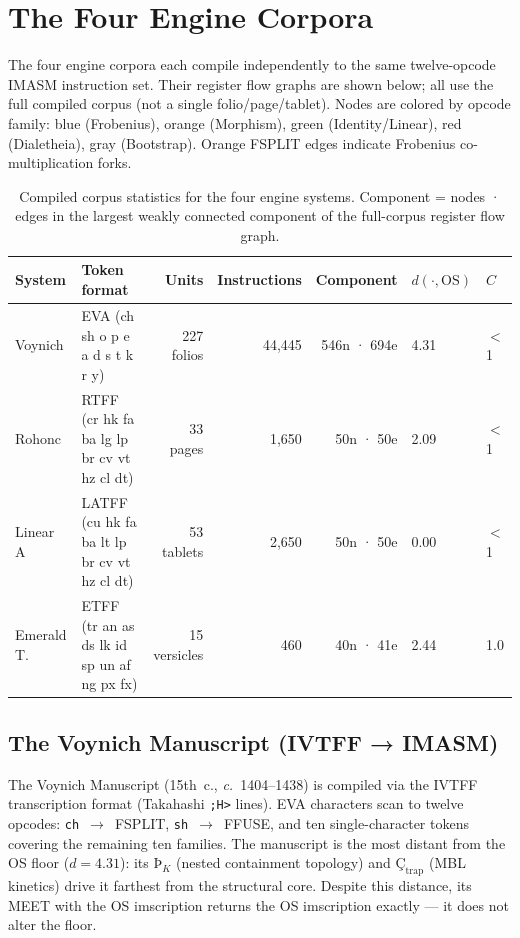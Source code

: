 \documentclass[12pt,a4paper]{article}
\begin{document}
\section{The Four Engine Corpora}
\label{sec:engines}

The four engine corpora each compile independently to the same twelve-opcode IMASM
instruction set. Their register flow graphs are shown below; all use the full compiled
corpus (not a single folio/page/tablet). Nodes are colored by opcode family: blue
(Frobenius), orange (Morphism), green (Identity/Linear), red (Dialetheia), gray
(Bootstrap). Orange FSPLIT edges indicate Frobenius co-multiplication forks.

\begin{table}[htbp]
\centering
\small
\begin{tabular}{llrrrll}
\toprule
System & Token format & Units & Instructions & Component & $d(\cdot,\text{OS})$ & $C$ \\
\midrule
Voynich      & EVA (ch sh o p e a d s t k r y)       & 227 folios   & 44{,}445 & 546n · 694e & 4.31 & $<$1 \\
Rohonc       & RTFF (cr hk fa ba lg lp br cv vt hz cl dt) & 33 pages  &  1{,}650 &  50n ·  50e & 2.09 & $<$1 \\
Linear A     & LATFF (cu hk fa ba lt lp br cv vt hz cl dt) & 53 tablets & 2{,}650 &  50n ·  50e & 0.00 & $<$1 \\
Emerald T.   & ETFF (tr an as ds lk id sp un af ng px fx) & 15 versicles &  460 &  40n ·  41e & 2.44 & 1.0 \\
\bottomrule
\end{tabular}
\caption{Compiled corpus statistics for the four engine systems. Component = nodes · edges
in the largest weakly connected component of the full-corpus register flow graph.}
\label{tab:engines}
\end{table}

\subsection{The Voynich Manuscript (IVTFF → IMASM)}

The Voynich Manuscript (15th~c., \emph{c.}~1404--1438) is compiled via the IVTFF
transcription format (Takahashi \texttt{;H>} lines). EVA characters scan to twelve
opcodes: \texttt{ch}~$\to$~FSPLIT, \texttt{sh}~$\to$~FFUSE, and ten single-character
tokens covering the remaining ten families. The manuscript is the most distant from
the OS floor ($d = 4.31$): its $\text{Þ}_K$ (nested containment topology) and
$\text{Ç}_\text{trap}$ (MBL kinetics) drive it farthest from the structural core.
Despite this distance, its MEET with the OS imscription returns the OS imscription
exactly --- it does not alter the floor.
\end{document}
